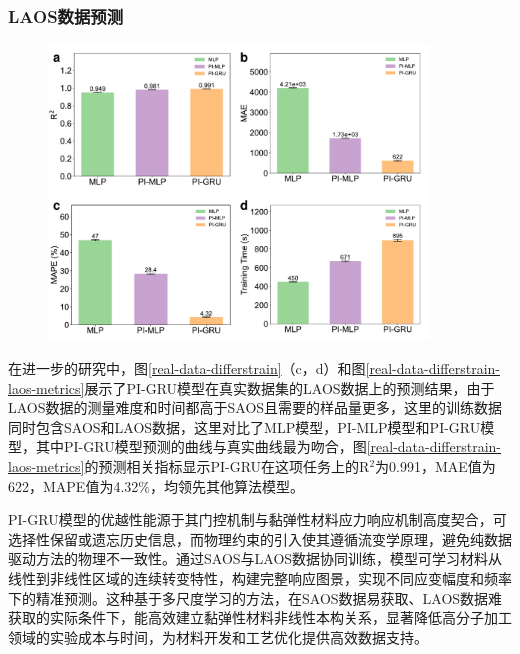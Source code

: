 \subsubsection{LAOS数据预测}
\begin{figure}
  \centering
  \includegraphics[width=0.9\textwidth]{Fig/real-data-differstrain-laos-metrics.pdf}
\end{figure}


在进一步的研究中，图\ref{real-data-differstrain}（c，d）和图\ref{real-data-differstrain-laos-metrics}展示了PI-GRU模型在真实数据集的LAOS数据上的预测结果，由于LAOS数据的测量难度和时间都高于SAOS且需要的样品量更多，这里的训练数据同时包含SAOS和LAOS数据，这里对比了MLP模型，PI-MLP模型和PI-GRU模型，其中PI-GRU模型预测的曲线与真实曲线最为吻合，图\ref{real-data-differstrain-laos-metrics}的预测相关指标显示PI-GRU在这项任务上的R$^2$为0.991，MAE值为622，MAPE值为4.32\%，均领先其他算法模型。

PI-GRU模型的优越性能源于其门控机制与黏弹性材料应力响应机制高度契合，可选择性保留或遗忘历史信息，而物理约束的引入使其遵循流变学原理，避免纯数据驱动方法的物理不一致性。通过SAOS与LAOS数据协同训练，模型可学习材料从线性到非线性区域的连续转变特性，构建完整响应图景，实现不同应变幅度和频率下的精准预测。这种基于多尺度学习的方法，在SAOS数据易获取、LAOS数据难获取的实际条件下，能高效建立黏弹性材料非线性本构关系，显著降低高分子加工领域的实验成本与时间，为材料开发和工艺优化提供高效数据支持。

